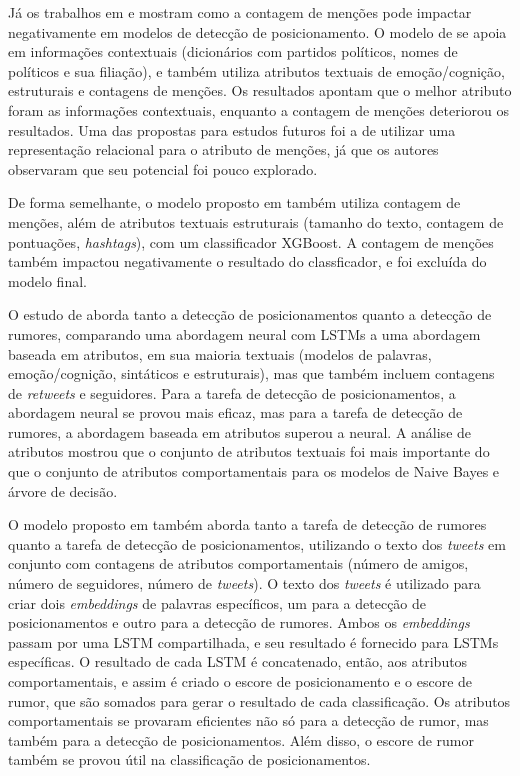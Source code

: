 \documentclass[
	12pt, oneside, a4paper, english, brazil
]{abntex2ppgsi}
\begin{document}
Já os trabalhos em  e  mostram como a contagem de menções pode impactar negativamente em modelos de detecção de posicionamento. O modelo de  se apoia em informações contextuais (dicionários com partidos políticos, nomes de políticos e sua filiação), e também utiliza atributos textuais de emoção/cognição, estruturais e contagens de menções. Os resultados apontam que o melhor atributo foram as informações contextuais, enquanto a contagem de menções deteriorou os resultados. Uma das propostas para estudos futuros foi a de utilizar uma representação relacional para o atributo de menções, já que os autores observaram que seu potencial foi pouco explorado.

De forma semelhante, o modelo proposto em  também utiliza contagem de menções, além de atributos textuais estruturais (tamanho do texto, contagem de pontuações, {\em hashtags}), com um classificador XGBoost. A contagem de menções também impactou negativamente o resultado do classficador, e foi excluída do modelo final.

O estudo de  aborda tanto a detecção de posicionamentos quanto a detecção de rumores, comparando uma abordagem neural com LSTMs a uma abordagem baseada em atributos, em sua maioria textuais (modelos de palavras, emoção/cognição, sintáticos e estruturais), mas que também incluem contagens de {\em retweets} e seguidores. Para a tarefa de detecção de posicionamentos, a abordagem neural se provou mais eficaz, mas para a tarefa de detecção de rumores, a abordagem baseada em atributos superou a neural. A análise de atributos mostrou que o conjunto de atributos textuais foi mais importante do que o conjunto de atributos comportamentais para os modelos de Naive Bayes e árvore de decisão.

O modelo proposto em  também aborda tanto a tarefa de detecção de rumores quanto a tarefa de detecção de posicionamentos, utilizando o texto dos {\em tweets} em conjunto com contagens de atributos comportamentais (número de amigos, número de seguidores, número de {\em tweets}). O texto dos {\em tweets} é utilizado para criar dois {\em embeddings} de palavras específicos, um para a detecção de posicionamentos e outro para a detecção de rumores. Ambos os {\em embeddings} passam por uma LSTM compartilhada, e seu resultado é fornecido para LSTMs específicas. O resultado de cada LSTM é concatenado, então, aos atributos comportamentais, e assim é criado o escore de posicionamento e o escore de rumor, que são somados para gerar o resultado de cada classificação. Os atributos comportamentais se provaram eficientes não só para a detecção de rumor, mas também para a detecção de posicionamentos. Além disso, o escore de rumor também se provou útil na classificação de posicionamentos.
\end{document}
